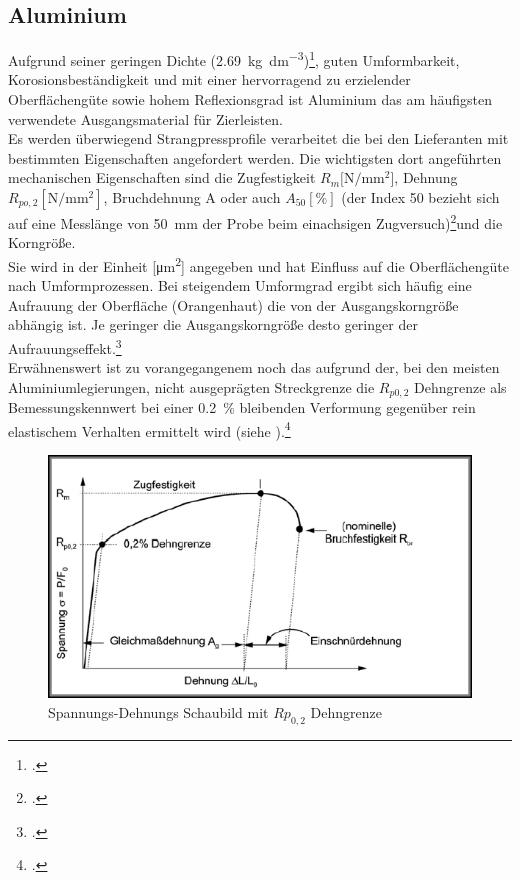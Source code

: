 \documentclass[12pt,a4paper,parskip]{scrartcl}
\begin{document}
{\subsection{Aluminium}
Aufgrund seiner geringen Dichte (\SI{2.69}{\kilo\gram\per\deci\meter\cubed})\footcite[Vgl.][353]{wm}, guten Umformbarkeit, Korosionsbeständigkeit und mit einer hervorragend zu erzielender Oberflächengüte sowie hohem Reflexionsgrad ist Aluminium das am häufigsten verwendete Ausgangsmaterial für Zierleisten.\\
 Es werden überwiegend Strangpressprofile verarbeitet die bei den Lieferanten mit bestimmten Eigenschaften angefordert werden. Die wichtigsten dort angeführten mechanischen Eigenschaften sind die Zugfestigkeit $R_m  [\si{\newton\per\milli\meter\squared}$], Dehnung $R_{po,2} [\si{\newton\per\milli\meter\squared}]$,   Bruchdehnung A oder auch $A_{50} [\si{\percent}]$ (der Index 50 bezieht sich auf eine Messlänge  von \SI{50}{\milli\meter} der Probe  beim einachsigen Zugversuch)\footcite[Vgl.][281]{aa}und die Korngröße.\\
  Sie wird in der Einheit [\si{\micro\meter\squared}] angegeben und hat Einfluss auf die Oberflächengüte nach  Umformprozessen. Bei steigendem Umformgrad ergibt sich häufig eine Aufrauung der Oberfläche (Orangenhaut) die von der Ausgangskorngröße abhängig ist. Je geringer die Ausgangskorngröße desto geringer der Aufrauungseffekt.\footcite[Vgl.][524]{aa}\\
Erwähnenswert ist zu vorangegangenem noch das aufgrund der, bei den meisten Aluminiumlegierungen, nicht ausgeprägten Streckgrenze  die $R_{p0,2}$ Dehngrenze als Bemessungskennwert bei einer \SI{0.2}{\percent} bleibenden Verformung gegenüber rein elastischem Verhalten ermittelt wird (siehe ).\footcite[Vgl.][280-281]{aa}  
\begin{figure}[h!tbp]
\centering
 	\includegraphics[width=.5\linewidth,height=.2\textheight]{spanndehn2}
 	\caption{Spannungs-Dehnungs Schaubild mit $Rp_{0,2} $ Dehngrenze}
 	\label{fig:spanndehn2}
 	\end{figure}
	 	 	 	 
	 	 	 	 

}
\end{document}

